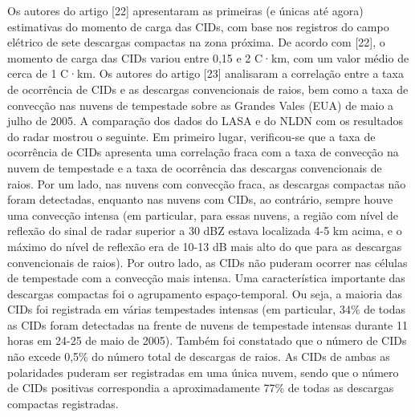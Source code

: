 \documentclass[a4paper, 12pt, onecolumn,singlespacing]{article}
\begin{document}
	Os autores do artigo [22] apresentaram as primeiras (e únicas até agora) estimativas do momento de carga das CIDs, com base nos registros do campo elétrico de sete descargas compactas na zona próxima. De acordo com [22], o momento de carga das CIDs variou entre 0,15 e 2 C·km, com um valor médio de cerca de 1 C·km. Os autores do artigo [23] analisaram a correlação entre a taxa de ocorrência de CIDs e as descargas convencionais de raios, bem como a taxa de convecção nas nuvens de tempestade sobre as Grandes Vales (EUA) de maio a julho de 2005. A comparação dos dados do LASA e do NLDN com os resultados do radar mostrou o seguinte. Em primeiro lugar, verificou-se que a taxa de ocorrência de CIDs apresenta uma correlação fraca com a taxa de convecção na nuvem de tempestade e a taxa de ocorrência das descargas convencionais de raios. Por um lado, nas nuvens com convecção fraca, as descargas compactas não foram detectadas, enquanto nas nuvens com CIDs, ao contrário, sempre houve uma convecção intensa (em particular, para essas nuvens, a região com nível de reflexão do sinal de radar superior a 30 dBZ estava localizada 4-5 km acima, e o máximo do nível de reflexão era de 10-13 dB mais alto do que para as descargas convencionais de raios). Por outro lado, as CIDs não puderam ocorrer nas células de tempestade com a convecção mais intensa. Uma característica importante das descargas compactas foi o agrupamento espaço-temporal. Ou seja, a maioria das CIDs foi registrada em várias tempestades intensas (em particular, 34\% de todas as CIDs foram detectadas na frente de nuvens de tempestade intensas durante 11 horas em 24-25 de maio de 2005). Também foi constatado que o número de CIDs não excede 0,5\% do número total de descargas de raios. As CIDs de ambas as polaridades puderam ser registradas em uma única nuvem, sendo que o número de CIDs positivas correspondia a aproximadamente 77\% de todas as descargas compactas registradas.
	
\end{document}
